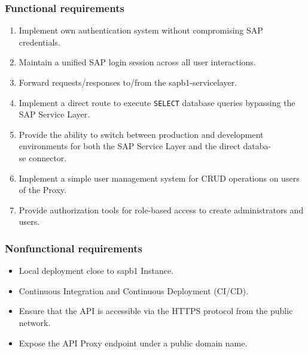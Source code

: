 \subsubsection{Functional requirements}
\label{subsubs:functional-requirements}
\begin{enumerate}[label=\bfseries \text{FR-SAP}\arabic*:,leftmargin=*]
    \item Implement own authentication system without compromising SAP credentials.
    \item Maintain a unified SAP login session across all user interactions.
    \item Forward requests/responses to/from the \gls{sapb1-servicelayer}.
    \item Implement a direct route to execute \texttt{SELECT} database queries bypassing the SAP Service Layer.
    \item Provide the ability to switch between production and development environments for both the SAP Service Layer and the direct databa-\\se connector.
    \item Implement a simple user management system for CRUD operations on users of the Proxy.
    \item Provide authorization tools for role-based access to create administrators and users.
\end{enumerate}

\subsubsection{Nonfunctional requirements}
\label{subsubsec:nonfunctional-requirements}
\begin{itemize}
    \item Local deployment close to \gls{sapb1} Instance.
    \item Continuous Integration and Continuous Deployment (\ac{CI}/\ac{CD}).
    \item Ensure that the API is accessible via the HTTPS protocol from the public network.
    \item Expose the API Proxy endpoint under a public domain name.
\end{itemize}

